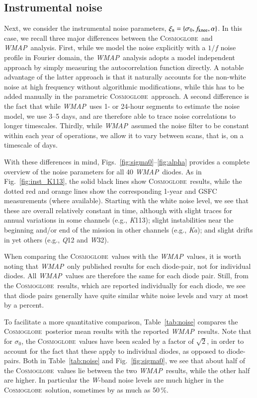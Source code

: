 \documentclass[twocolumn]{../../common/aa}
\def\WMAP{\emph{WMAP}}
\newcommand{\cosmoglobe}{\textsc{Cosmoglobe}}
\newcommand{\K}[0]{\textit K}
\newcommand{\Ka}[0]{\textit{Ka}}
\newcommand{\Q}[0]{\textit Q}
\newcommand{\W}[0]{\textit W}
\begin{document}
\subsection{Instrumental noise}
\label{sec:noise}

Next, we consider the instrumental noise parameters, $\xi_\mathrm{n}=\{\sigma_0, \fknee, \alpha\}$. In this case, we recall three major differences between the \cosmoglobe\ and \WMAP\ analysis. First, while we model the noise explicitly with a $1/f$ noise profile in Fourier domain, the \WMAP\ analysis adopts a model independent approach by simply measuring the autocorrelation function directly. A notable advantage of the latter approach is that it naturally accounts for the non-white noise at high frequency without algorithmic modifications, while this has to be added manually in the parametric \cosmoglobe\ approach. A second difference is the fact that while \WMAP\ uses 1- or 24-hour segments to estimate the noise model, we use 3--5 days, and are therefore able to trace noise correlations to longer timescales. Thirdly, while \WMAP\ assumed the noise filter to be constant within each year of operations, we allow it to vary between scans, that is, on a timescale of days.

With these differences in mind, Figs.~\ref{fig:sigma0}--\ref{fig:alpha} provides a complete overview of the noise parameters for all 40 \WMAP\ diodes. As in Fig.~\ref{fig:inst_K113}, the solid black lines show \cosmoglobe\ results, while the dotted red and orange lines show the corresponding 1-year and GSFC measurements (where available). Starting with the white noise level, we see that these are overall relatively constant in time, although with slight traces for annual variations in some channels (e.g., \K113); slight instabilities near the beginning and/or end of the mission in other channels (e.g., \Ka); and slight drifts in yet others (e.g., \Q12 and \W32).

When comparing the \cosmoglobe\ values with the \WMAP\ values, it is worth noting that \WMAP\ only published results for each diode-pair, not for individual diodes. All \WMAP\ values are therefore the same for each diode pair. Still, from the \cosmoglobe\ results, which are reported individually for each diode, we see that diode pairs generally have quite similar white noise levels and vary at most by a percent.

To facilitate a more quantitative comparison, Table~\ref{tab:noise} compares the \cosmoglobe\ posterior mean results with the reported \WMAP\ results. Note that for $\sigma_0$, the \cosmoglobe\ values have been scaled by a factor of $\sqrt{2}$, in order to account for the fact that these apply to individual diodes, as opposed to diode-pairs. Both in Table~\ref{tab:noise} and Fig.~\ref{fig:sigma0}, we see that about half of the \cosmoglobe\ values lie between the two \WMAP\ results, while the other half are higher. In particular the \W-band noise levels are much higher in the \cosmoglobe\ solution, sometimes by as much as 50\,\%.
\end{document}
